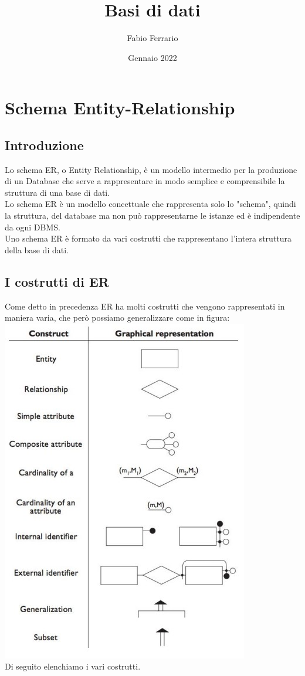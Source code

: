 \documentclass[12pt, a4paper, openany]{book}
\begin{document}
\title{Basi di dati}
\author{Fabio Ferrario}
\date{Gennaio 2022}

\maketitle
\tableofcontents


\chapter{Schema Entity-Relationship}

\section{Introduzione}
Lo schema ER, o Entity Relationship, è un modello intermedio per la produzione di un Database che serve a rappresentare in modo semplice e comprensibile la struttura di una base di dati.
\\Lo schema ER è un modello concettuale che rappresenta solo lo "schema", quindi la struttura, del database ma non può rappresentarne le istanze ed è indipendente da ogni DBMS.
\\Uno schema ER è formato da vari costrutti che rappresentano l'intera struttura della base di dati.

\section{I costrutti di ER}
Come detto in precedenza ER ha molti costrutti che vengono rappresentati in maniera varia, che però possiamo generalizzare come in figura:
\\\includegraphics{rappresentazione-er.jpg}
\\Di seguito elenchiamo i vari costrutti.
\end{document}
